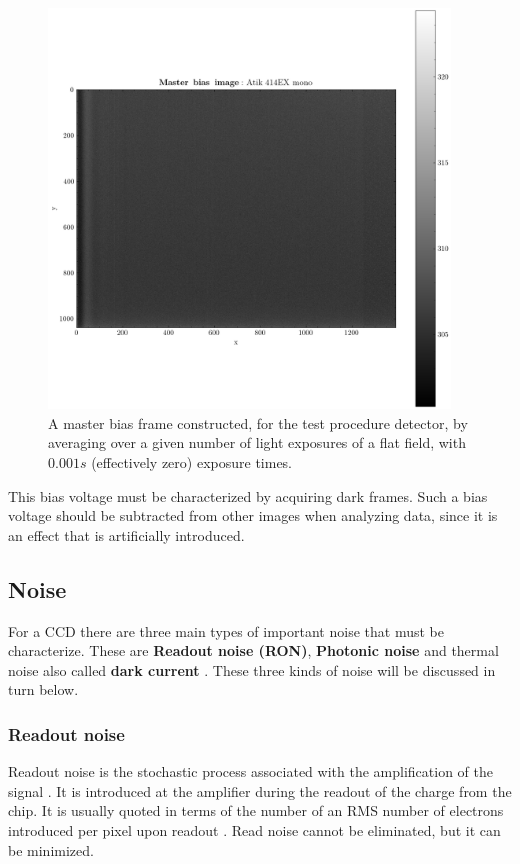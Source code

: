 \documentclass[../main.tex]{subfiles}
\begin{document}
	\begin{figure}[h!]
		\centering
		\includegraphics[width	=0.95\textwidth]{master_bias.png}
		\caption{A master bias frame constructed, for the test procedure detector, by averaging over a given number of light exposures of a flat field, with $0.001s$ (effectively zero) exposure times.}
		\label{fig:masterbias}
	\end{figure}
	
	This bias voltage must be characterized by acquiring dark frames. Such a bias voltage should be subtracted from other images when analyzing data, since it is an effect that is artificially introduced.
	
	\subsection{Noise}
	For a CCD there are three main types of important noise that must be characterize. These are \textbf{Readout noise (RON)}, \textbf{Photonic noise} and thermal noise also called \textbf{dark current} \cite{handbookofccdastronomy}. These three kinds of noise will be discussed in turn below. 
	
	\subsubsection{Readout noise}\label{ron}
	Readout noise is the stochastic process associated with the amplification of the signal \cite{handbookofccdastronomy}. It is introduced at the amplifier during the readout of the charge from the chip. It is usually quoted in terms of the number of an RMS number of electrons introduced per pixel upon readout \cite{handbookofccdastronomy}. Read noise cannot be eliminated, but it can be minimized. 
	
\end{document}
